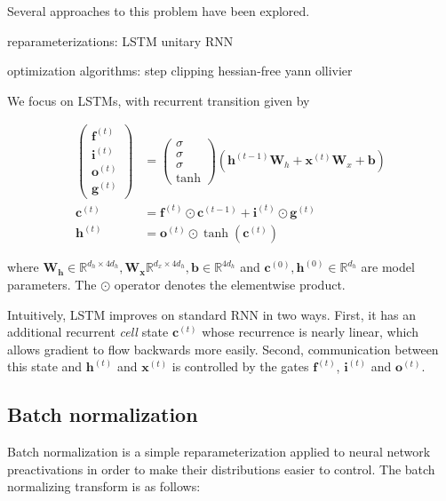 \documentclass{article} %
\newcommand{\vect}[1]{\mathbf{#1}}
\newcommand{\mat}[1]{\mathbf{#1}}
\newcommand{\ewprod}{\odot}
\newcommand{\reals}{\mathbb{R}}
\begin{document}
Several approaches to this problem have been explored.

reparameterizations:
LSTM
unitary RNN

optimization algorithms:
step clipping
hessian-free
yann ollivier

We focus on LSTMs, with recurrent transition given by

\begin{align}
\left(\begin{array}{ccc}
\vect{f}^{(t)} \\
\vect{i}^{(t)} \\
\vect{o}^{(t)} \\
\vect{g}^{(t)}
\end{array}\right)
 &=
\left(\begin{array}{ccc}
\sigma \\
\sigma \\
\sigma \\
\tanh
\end{array}\right)
\left(
 \vect{h}^{(t-1)} \mat{W}_h +
 \vect{x}^{(t)}   \mat{W}_x +
 \vect{b}
\right) \\
\vect{c}^{(t)} &= \vect{f}^{(t)} \ewprod \vect{c}^{(t-1)} +
                  \vect{i}^{(t)} \ewprod \vect{g}^{(t)} \\
\vect{h}^{(t)} &= \vect{o}^{(t)} \ewprod \tanh(\vect{c}^{(t)})
\end{align}

where $\vect{W_h} \in \reals^{d_h \times 4 d_h}, \vect{W_x} \reals^{d_x \times 4 d_h}, \vect{b} \in \reals^{4 d_h}$ and $\vect{c}^{(0)}, \vect{h}^{(0)} \in \reals^{d_h}$ are model parameters.
The $\ewprod$ operator denotes the elementwise product.

Intuitively, LSTM improves on standard RNN in two ways.
First, it has an additional recurrent \emph{cell} state $\vect{c}^{(t)}$ whose recurrence is nearly linear, which allows gradient to flow backwards more easily.
Second, communication between this state and $\vect{h}^{(t)}$ and $\vect{x}^{(t)}$ is controlled by the gates $\vect{f}^{(t)}$, $\vect{i}^{(t)}$ and $\vect{o}^{(t)}$.

\subsection{Batch normalization}

Batch normalization is a simple reparameterization applied to neural network preactivations in order to make their distributions easier to control.
The batch normalizing transform is as follows:
\end{document}
